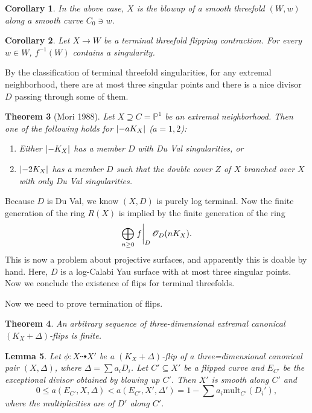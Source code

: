 \documentclass[leqno, openany]{memoir}
\newtheorem{thm}{Theorem}[section]
\newtheorem{cor}[thm]{Corollary}
\newtheorem{lem}[thm]{Lemma}
\theoremstyle{definition}
\theoremstyle{remark}
\theoremstyle{plain}
\theoremstyle{definition}
\theoremstyle{remark}
\renewcommand{\P}{\mathbb{P}}
\newcommand{\msc}[1]{\mathscr{#1}}
\begin{document}
\begin{cor}
    In the above case, $X$ is the blowup of a smooth threefold $(W, w)$ along a smooth curve $C_0 \ni w$.
\end{cor}

\begin{cor}
    Let $X \to W$ be a terminal threefold flipping contraction. For every $w \in W$, $f^{-1}(W)$ contains a singularity.
\end{cor}

By the classification of terminal threefold singularities, for any extremal neighborhood, there are at most three singular points and there is a nice divisor $D$ passing through some of them.

\begin{thm}[Mori 1988]
    Let $X \supseteq C = \P^1$ be an extremal neighborhood. Then one of the following holds for $\abs{-aK_X}$ ($a = 1, 2$):
    \begin{enumerate}
        \item Either $\abs{-K_X}$ has a member $D$ with Du Val singularities, or
        \item $\abs{-2K_X}$ has a member $D$ such that the double cover $Z$ of $X$ branched over $X$ with only Du Val singularities.
    \end{enumerate}
\end{thm}

Because $D$ is Du Val, we know $(X, D)$ is purely log terminal. Now the finite generation of the ring $R(X)$ is implied by the finite generation of the ring
\[ \bigoplus_{n \geq 0} \eval{f}_D \msc{O}_D(nK_X). \]
This is now a problem about projective surfaces, and apparently this is doable by hand. Here, $D$ is a log-Calabi Yau surface with at most three singular points. Now we conclude the existence of flips for terminal threefolds.

Now we need to prove termination of flips. 

\begin{thm}
    An arbitrary sequence of three-dimensional extremal canonical $(K_X + \Delta)$-flips is finite.
\end{thm}

\begin{lem}
    Let $\phi \colon X \dashrightarrow X'$ be a $(K_X + \Delta)$-flip of a three=dimensional canonical pair $(X, \Delta)$, where $\Delta = \sum a_i D_i$. Let $C' \subseteq X'$ be a flipped curve and $E_{C'}$ be the exceptional divisor obtained by blowing up $C'$. Then $X'$ is smooth along $C'$ and 
    \[ 0 \leq a(E_{C'}, X, \Delta) < a(E_{C'}, X', \Delta') = 1 - \sum a_i \text{mult}_{C'} (D_i'), \]
    where the multiplicities are of $D'$ along $C'$.
\end{lem}
\end{document}

